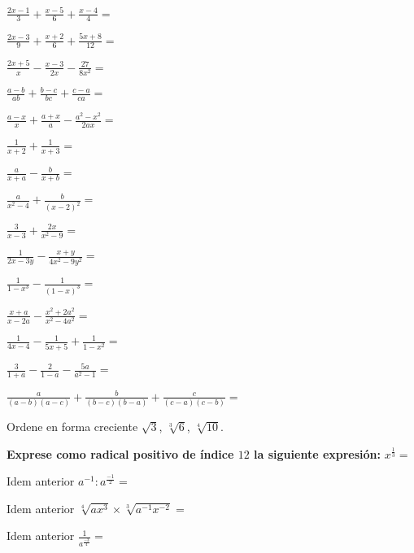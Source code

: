 \message{ !name(GUIA-1-LENGUAJE-ALGEBRAICO.tex)}\documentclass[12pt,addpoints,x11names]{exam}
\begin{document}
\begin{questions}

  \begin{multicols}{2}
    \question $\frac{2x-1}{3}+\frac{x-5}{6}+\frac{x-4}{4}=$
    
    \question $\frac{2x-3}{9}+\frac{x+2}{6}+\frac{5x+8}{12}=$
    
    \question $\frac{2x+5}{x}-\frac{x-3}{2x}-\frac{27}{8x^2}=$
    
    \question $\frac{a-b}{ab}+\frac{b-c}{bc}+\frac{c-a}{ca}=$
    
    \question $\frac{a-x}{x}+\frac{a+x}{a}-\frac{a^2-x^2}{2ax}=$

    \question $\frac{1}{x+2}+\frac{1}{x+3}=$

    \question $\frac{a}{x+a}-\frac{b}{x+b}=$

    \question $\frac{a}{x^2-4}+\frac{b}{(x-2)^2}=$

    \question $\frac{3}{x-3}+\frac{2x}{x^2-9}=$

    \question $\frac{1}{2x-3y}-\frac{x+y}{4x^2-9y^2}=$

    \question $\frac{1}{1-x^3}-\frac{1}{(1-x)^3}=$

    \question $\frac{x+a}{x-2a}-\frac{x^2+2a^2}{x^2-4a^2}=$

    \question $\frac{1}{4x-4}-\frac{1}{5x+5}+\frac{1}{1-x^2}=$

    \question $\frac{3}{1+a}-\frac{2}{1-a}-\frac{5a}{a^2-1}=$

    \question $\frac{a}{(a-b)(a-c)}+\frac{b}{(b-c)(b-a)}+\frac{c}{(c-a)(c-b)}=$

\end{multicols}


\begin{multicols}{2}
  
    \question Ordene en forma creciente $\sqrt{3}$, $\sqrt[3]{6}$,
      $\sqrt[4]{10}$.
      
    \question \textbf{Exprese como radical positivo de índice $12$ la siguiente expresión:} $x^{\frac{1}{3}}=$

    \question Idem anterior $a^{-1}:a^{\frac{-1}{2}}=$

    \question Idem anterior $\sqrt[4]{ax^3}\times\sqrt[3]{a^{-1}x^{-2}}=$
      
    \question Idem anterior $\frac{1}{a^{\frac{-3}{4}}}=$


\end{multicols}
\end{questions}
\end{document}
